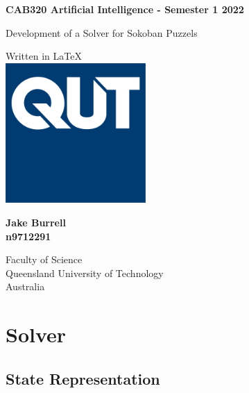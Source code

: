\documentclass[a4paper,12pt]{article}
\begin{document}
\begin{titlepage}
   \begin{center}
       \vspace*{1cm}
 
       \textbf{CAB320 Artificial Intelligence - Semester 1 2022}
 
       \vspace{0.5cm}
        \LARGE{Development of a Solver for Sokoban Puzzels}
 
       \vspace{1.5cm}

       \vfill
       
       \vspace{0.8cm}
       \normalsize
 	   Written in \LaTeX \\
       \includegraphics[width=0.4\textwidth]{QUT.jpg}

       \large
       \textbf{Jake Burrell}\\
       \textbf{n9712291}

       \vspace{1.5cm}
 
       \normalsize
       Faculty of Science \\
       Queensland University of Technology\\
       Australia\\ 
   \end{center}
\end{titlepage}


\section{Solver}
\subsection{State Representation}
\end{document}
